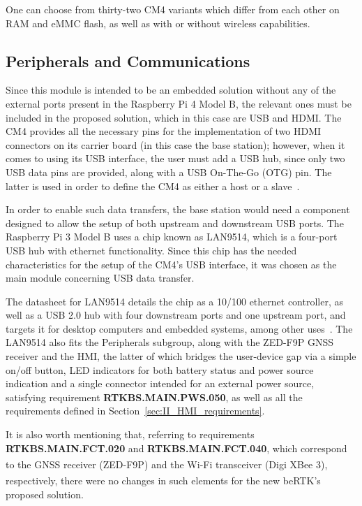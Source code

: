One can choose from thirty-two CM4 variants which differ from each other on RAM and eMMC flash, as well as with or without wireless capabilities.

\subsection{Peripherals and Communications}\label{sec:312_Peripherals_Communications}

Since this module is intended to be an embedded solution without any of the external ports present in the Raspberry Pi 4 Model B, the relevant ones must be included in the proposed solution, which in this case are USB and HDMI. The CM4 provides all the necessary pins for the implementation of two HDMI connectors on its carrier board (in this case the base station); however, when it comes to using its USB interface, the user must add a USB hub, since only two USB data pins are provided, along with a USB On-The-Go (OTG) pin. The latter is used in order to define the CM4 as either a host or a slave~\cite{CM4}.


In order to enable such data transfers, the base station would need a component designed to allow the setup of both upstream and downstream USB ports. The Raspberry Pi 3 Model B uses a chip known as LAN9514, which is a four-port USB hub with ethernet functionality. Since this chip has the needed characteristics for the setup of the CM4's USB interface, it was chosen as the main module concerning USB data transfer.

The datasheet for LAN9514 details the chip as a 10/100 ethernet controller, as well as a USB 2.0 hub with four downstream ports and one upstream port, and targets it for desktop computers and embedded systems, among other uses~\cite{LAN9514}. The LAN9514 also fits the Peripherals subgroup, along with the ZED-F9P GNSS receiver and the HMI, the latter of which bridges the user-device gap via a simple on/off button, LED indicators for both battery status and power source indication and a single connector intended for an external power source, satisfying requirement \textbf{RTKBS.MAIN.PWS.050}, as well as all the requirements defined in Section~\ref{sec:II_HMI_requirements}.

It is also worth mentioning that, referring to requirements \textbf{RTKBS.MAIN.FCT.020} and \textbf{RTKBS.MAIN.FCT.040}, which correspond to the GNSS receiver (ZED-F9P) and the Wi-Fi transceiver (Digi XBee\textsuperscript{\textregistered} 3), respectively, there were no changes in such elements for the new beRTK\textsuperscript{\textregistered}'s proposed solution.

